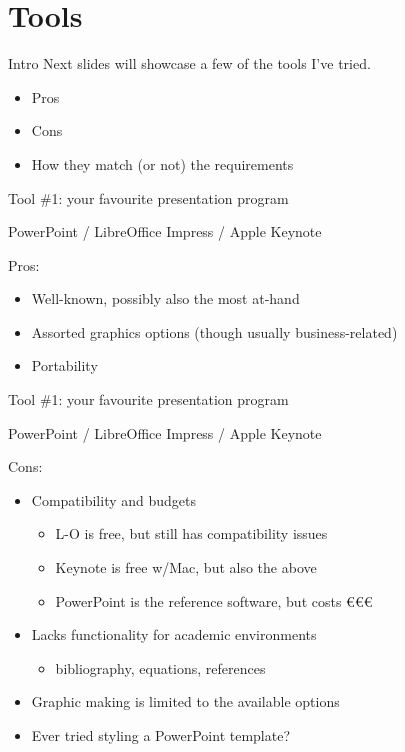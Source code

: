 \documentclass[aspectratio=169]{fireshonks}
\begin{document}
\section{Tools}
\begin{frame}{Intro}
  Next slides will showcase a few of the tools I've tried.

  \begin{itemize}
    \item Pros
    \item Cons
    \item How they match (or not) the requirements
  \end{itemize}
\end{frame}
\begin{frame}{Tool \#1: your favourite presentation program}
  \begin{center}
    PowerPoint / LibreOffice Impress / Apple Keynote
  \end{center}

  Pros:
  \begin{itemize}
    \item Well-known, possibly also the most at-hand
    \item Assorted graphics options (though usually business-related)
    \item Portability
  \end{itemize}
\end{frame}
\begin{frame}{Tool \#1: your favourite presentation program}
  \begin{center}
    PowerPoint / LibreOffice Impress / Apple Keynote
  \end{center}

  Cons:
  \begin{itemize}
    \item Compatibility and budgets
          \begin{itemize}
            \item L-O is free, but still has compatibility issues
            \item Keynote is free w/Mac, but also the above
            \item PowerPoint is the reference software, but costs \euro\euro\euro
          \end{itemize}
    \item Lacks functionality for academic environments
          \begin{itemize}
            \item bibliography, equations, references
          \end{itemize}
    \item Graphic making is limited to the available options
    \item Ever tried styling a PowerPoint template?
  \end{itemize}
\end{frame}
\end{document}

